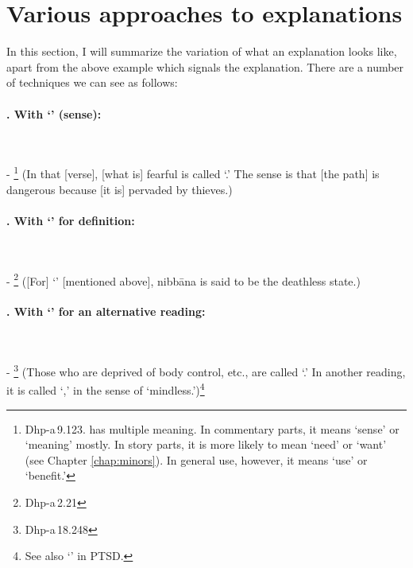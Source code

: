 {}
\section*{Various approaches to explanations}

In this section, I will summarize the variation of what an explanation looks like, apart from the above example which  signals the explanation. There are a number of techniques we can see as follows:

\setcounter{parnum}{1}
\paragraph*{. With `' (sense):}\ \par
- \footnote{Dhp-a\,9.123.  has multiple meaning. In commentary parts, it means `sense' or `meaning' mostly. In story parts, it is more likely to mean `need' or `want' (see Chapter \ref{chap:minors}). In general use, however, it means `use' or `benefit.'} (In that [verse], [what is] fearful is called `.' The sense is that [the path] is dangerous because [it is] pervaded by thieves.)\par

\paragraph*{. With `' for definition:}\ \par
- \footnote{Dhp-a\,2.21} ([For] `' [mentioned above], nibb\=ana is said to be the deathless state.)\par

\paragraph*{. With `' for an alternative reading:}\ \par
- \footnote{Dhp-a\,18.248} (Those who are deprived of body control, etc., are called `.' In another reading, it is called `,' in the sense of `mindless.')\footnote{See also `' in PTSD.}\par

